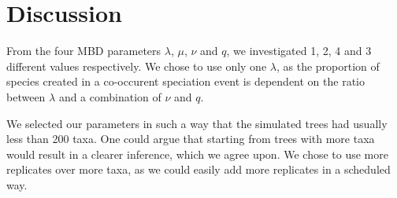 \section{Discussion}

From the four MBD parameters $\lambda$, $\mu$, $\nu$ and $q$,
we investigated 1, 2, 4 and 3 different values respectively.
We chose to use only one $\lambda$, as the proportion of species
created in a co-occurent speciation event is dependent on the ratio
between $\lambda$ and a combination of $\nu$ and $q$.  

We selected our parameters in such a way that the simulated trees 
had usually less than 200 taxa. One could argue that starting from
trees with more taxa would result in a clearer inference, which we
agree upon. We chose to use more replicates over more taxa, 
as we could easily add more replicates in a scheduled way.

  


